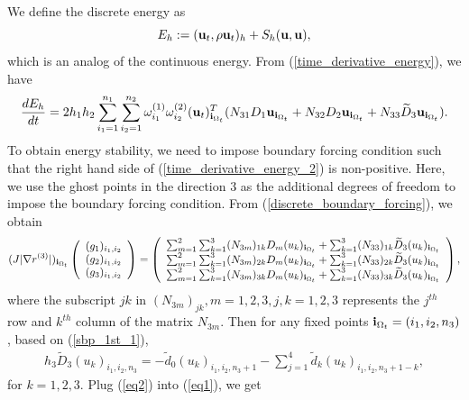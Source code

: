 \documentclass[a4paper]{article}
\newcommand{\wt}{\widetilde}
\begin{document}
We define the discrete energy as
\begin{equation*}
E_h := ({\bf u}_t, \rho{\bf u}_t)_h + S_h({\bf u},{\bf u}),
\end{equation*}
which is an analog of the continuous energy. 
From (\ref{time_derivative_energy}), we have
\begin{equation}\label{time_derivative_energy_2}
\frac{dE_h}{dt} = 2h_1h_2\sum_{{i_1}=1}^{n_1}\sum_{{i_2}=1}^{n_2}\omega_{i_1}^{(1)}\omega_{i_2}^{(2)}({\bf u}_t)_{{\bf i}_{\Omega_t}}^T(N_{31}D_1{\bf u}_{{\bf i}_{\Omega_t}} + N_{32}D_2{\bf u}_{{\bf i}_{\Omega_t}} +N_{33}\wt{D}_3{\bf u}_{{\bf i}_{\Omega_t}}).
\end{equation}
To obtain energy stability, we need to impose boundary forcing condition such that the right hand side of (\ref{time_derivative_energy_2}) is non-positive. Here, we use the ghost points in the direction $3$ as the additional degrees of freedom to impose the boundary forcing condition. From (\ref{discrete_boundary_forcing}), we obtain
\begin{equation}\label{eq1}
(J|\nabla r^{(3)}|)_{{\bf i}_{\Omega_t}} \left(\begin{array}{c}
(g_1)_{i_1,i_2} \\
(g_2)_{i_1,i_2}\\
(g_3)_{i_1,i_2}\end{array}\right) = \left(\begin{array}{c}
\sum_{m=1}^2\sum_{k=1}^3(N_{3m})_{1k}D_m(u_k)_{{\bf i}_{\Omega_t}} +\sum_{k=1}^3(N_{33})_{1k}\wt{D}_3(u_k)_{{\bf i}_{\Omega_t}}\\
\sum_{m=1}^2\sum_{k=1}^3(N_{3m})_{2k}D_m(u_k)_{{\bf i}_{\Omega_t}} 
+\sum_{k=1}^3(N_{33})_{2k}\wt{D}_3(u_k)_{{\bf i}_{\Omega_t}} \\
\sum_{m=1}^2\sum_{k=1}^3(N_{3m})_{3k}D_m(u_k)_{{\bf i}_{\Omega_t}}
+\sum_{k=1}^3(N_{33})_{3k}\wt{D}_3(u_k)_{{\bf i}_{\Omega_t}}
\end{array}\right),
\end{equation}
where the subscript $jk$ in $(N_{3m})_{jk}, m = 1,2,3, j,k = 1,2,3$ represents the $j^{th}$ row and $k^{th}$ column of the matrix $N_{3m}$. Then for any fixed points ${\bf i}_{\Omega_t} = (i_1,i_2,n_3)$, based on (\ref{sbp_1st_1}),
\begin{align}\label{eq2}
h_3 \tilde{D}_3(u_k)_{i_1,i_2,n_3} = -\tilde{d}_0 (u_k)_{i_1,i_2,n_3+1} - \sum_{j = 1}^4  \tilde{d}_k (u_k)_{i_1,i_2,n_3+1-k},
\end{align}
for $k = 1,2,3$. Plug (\ref{eq2}) into (\ref{eq1}), we get
\end{document}
